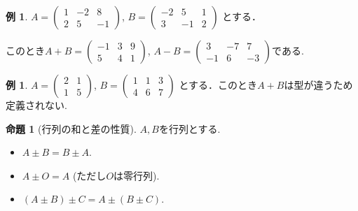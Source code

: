 \documentclass[dvipdfmx,a4paper,11pt]{article}
\theoremstyle{definition}
\newtheorem{prop}[thm]{命題}
\newtheorem{exa}[thm]{例}
\begin{document}
 \begin{exa}
 $A = 
 \begin{pmatrix}
 1 &-2&8 \\
 2&5&-1
 \end{pmatrix}
 $, 
 $
 B = 
 \begin{pmatrix}
 -2&5&1 \\
 3&-1&2
 \end{pmatrix}
 $
 とする．
 
 このとき$
 A+B =
 \begin{pmatrix}
 -1 &3&9 \\
 5&4&1
 \end{pmatrix}
 $, 
 $
  A-B =
 \begin{pmatrix}
 3 &-7&7 \\
 -1&6&-3
 \end{pmatrix}
 $である.
 \end{exa}

 \begin{exa}
 $A = 
 \begin{pmatrix}
 2&1 \\
 1&5
 \end{pmatrix}
 $,
$ 
 B = 
 \begin{pmatrix}
 1&1 &3 \\
 4&6 & 7
 \end{pmatrix}
 $
 とする．このとき$A+B$は型が違うため定義されない. 
 \end{exa}


 \begin{tcolorbox}[
    colback = white,
    colframe = green!35!black,
    fonttitle = \bfseries,
    breakable = true]
    \begin{prop}[行列の和と差の性質]
$A, B$を行列とする.
 \begin{itemize}
 \setlength{\parskip}{0cm}
  	\setlength{\itemsep}{0pt} 
 \item $A\pm B =B\pm A$.
  \item $A\pm O =A$ (ただし$O$は零行列).
  \item $(A \pm B) \pm C =A \pm  (B\pm C)$.
 \end{itemize}
  \end{prop}
 \end{tcolorbox}
 
\end{document}
